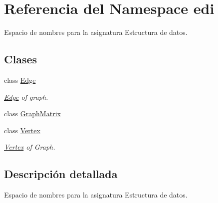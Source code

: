 \hypertarget{namespaceedi}{}\section{Referencia del Namespace edi}
\label{namespaceedi}


Espacio de nombres para la asignatura Estructura de datos.  


\subsection*{Clases}
\begin{DoxyCompactItemize}
\item 
class \hyperlink{classedi_1_1Edge}{Edge}
\begin{DoxyCompactList}\small\item\em \hyperlink{classedi_1_1Edge}{Edge} of graph. \end{DoxyCompactList}\item 
class \hyperlink{classedi_1_1GraphMatrix}{Graph\+Matrix}
\item 
class \hyperlink{classedi_1_1Vertex}{Vertex}
\begin{DoxyCompactList}\small\item\em \hyperlink{classedi_1_1Vertex}{Vertex} of Graph. \end{DoxyCompactList}\end{DoxyCompactItemize}


\subsection{Descripción detallada}
Espacio de nombres para la asignatura Estructura de datos. 